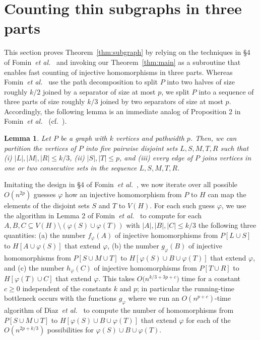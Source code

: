 \documentclass{amsart}
\newtheorem{Lem}{Lemma}
\begin{document}
\section{Counting thin subgraphs in three parts}
\label{sect:homomorphims-in-three-parts}

This section proves Theorem~\ref{thm:subgraph} by relying on the techniques 
in \S4 of Fomin~{\em et al.}~\cite{FLRRS12} and invoking our 
Theorem~\ref{thm:main} as a subroutine that enables 
fast counting of injective homomorphisms in three parts.
Whereas Fomin~{\em et al.}~\cite{FLRRS12}
use the path decomposition to split $P$ into two halves of size roughly 
$k/2$ joined by a separator of size at most $p$, we split $P$ into 
a sequence of three parts of size roughly $k/3$ joined by two separators 
of size at most $p$. Accordingly, the following lemma is an immediate analog 
of Proposition 2 in Fomin~{\em et al.}~\cite{FLRRS12} (cf.~\cite{K92}).

\begin{Lem}
Let $P$ be a graph with $k$ vertices and pathwidth $p$. Then, we can partition
the vertices of $P$ into five pairwise disjoint sets $L,S,M,T,R$ such that
(i) $|L|,|M|,|R|\leq k/3$, (ii) $|S|,|T|\leq p$, and (iii) every edge of $P$
joins vertices in one or two consecutive sets in the sequence $L,S,M,T,R$. 
\end{Lem}

Imitating the design in \S4 of Fomin~{\em et al.}~\cite{FLRRS12},
we now iterate over all possible $O(n^{2p})$
guesses $\varphi$ how an injective homomorphism from $P$ to $H$ can map 
the elements of the disjoint sets $S$ and $T$ to $V(H)$. For each such 
guess $\varphi$, we use the algorithm in Lemma 2 
of Fomin~{\em et al.}~\cite{FLRRS12} to compute 
for each $A,B,C\subseteq V(H)\setminus (\varphi(S)\cup \varphi(T))$ 
with $|A|,|B|,|C|\leq k/3$ the following three quantities:
(a) the number $f_\varphi(A)$ of injective homomorphisms 
from $P[L\cup S]$ to $H[A\cup \varphi(S)]$ that extend $\varphi$, 
(b) the number $g_\varphi(B)$ of injective homomorphisms 
from $P[S\cup M\cup T]$ to $H[\varphi(S)\cup B\cup\varphi(T)]$ that extend $\varphi$, 
and
(c) the number $h_\varphi(C)$ of injective homomorphisms 
from $P[T\cup R]$ to $H[\varphi(T)\cup C]$ that extend $\varphi$.
This takes $O\bigl(n^{k/3+3p+c}\bigr)$ time for a constant $c\geq 0$ independent
of the constants $k$ and $p$; in particular the running-time bottleneck 
occurs with the functions $g_\varphi$ where we run an $O(n^{p+c})$-time
algorithm of D{\'{\i}}az~{\em et al.}~\cite{DST02} to compute the number
of homomorphisms from $P[S\cup M\cup T]$ to $H[\varphi(S)\cup B\cup\varphi(T)]$
that extend $\varphi$ for each of the $O(n^{2p+k/3})$ possibilities for 
$\varphi(S)\cup B\cup\varphi(T)$.
 
\end{document}
